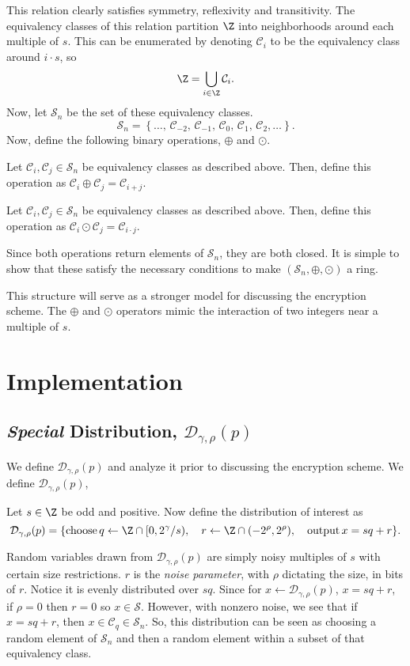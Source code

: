 \documentclass[a4paper,11pt, oneside]{article}
\newcommand{\C}[1]{\mathcal{C}_{#1}}
\renewcommand{\D}{\mathcal{D}_{\gamma,\rho}(p)}
\newcommand{\ring}{\mathcal{S}}
\newcommand{\nring}{\mathcal{S}_n}
\begin{document}
This relation clearly satisfies symmetry, reflexivity and transitivity.  The equivalency classes of this relation partition $\Z$ into neighborhoods around each multiple of $s$.  This can be enumerated by denoting $\mathcal{C}_i$ to be the equivalency class around $i\cdot s$, so
\[\Z= \bigcup_{i\in\Z} \C{i}.\]
Now, let $\nring$ be the set of these equivalency classes.  
\[\nring = \left\{\dots,\, \C{-2},\,\C{-1},\,\C{0},\,\C{1},\,\C{2},\dots \right\} .\]
Now, define the following binary operations, $\oplus$ and $\odot$.
\begin{definition}
    Let $\C{i},\C{j}\in\nring$ be equivalency classes as described above.  Then, define this operation as $\C{i} \oplus \C{j} = \C{i+j}$.
\end{definition}

\begin{definition}
    Let $\C{i},\C{j}\in\nring$ be equivalency classes as described above.  Then, define this operation as $\C{i} \odot \C{j} = \C{i\cdot j}$.
\end{definition}

Since both operations return elements of $\nring$, they are both closed.  It is simple to show that these satisfy the necessary conditions to make $\left(\nring, \oplus, \odot\right)$ a ring.

This structure will serve as a stronger model for discussing the encryption scheme.  The $\oplus$ and $\odot$ operators mimic the interaction of two integers near a multiple of $s$.

\section{Implementation}
    \subsection{\textit{Special} Distribution, $\D$}
    We define $\D$ and analyze it prior to discussing the encryption scheme.  We define $\D$,
\begin{definition}
    Let $s\in\Z$ be odd and positive.  Now define the distribution of interest as
    \[
        \D = \{ \text{choose}\, q\leftarrow\Z\cap[0,2^\gamma/s),\quad r\leftarrow \Z\cap (-2^{\rho}, 2^\rho),\quad\text{output}\, x = sq+r\}.
        \] 
\end{definition}

Random variables drawn from $\D$ are simply noisy multiples of $s$ with certain size restrictions. $r$ is the \emph{noise parameter}, with $\rho$ dictating the size, in bits of $r$.  Notice it is evenly distributed over $sq$.  Since for $x\leftarrow\D$, $x = sq+r$, if $\rho = 0$ then $r = 0$ so $x\in\ring$.  However, with nonzero noise, we see that if $x = sq+r$, then $x\in\C{q}\in\nring$.  So, this distribution can be seen as choosing a random element of $\nring$ and then a random element within a subset of that equivalency class.  
\end{document}
